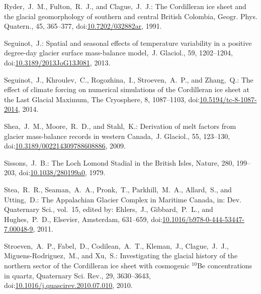 \documentclass[tc, manuscript]{copernicus}
\begin{document}
\begin{thebibliography}{114}
Ryder,~J.~M., Fulton,~R.~J., and Clague,~J.~J.: The Cordilleran ice sheet and the glacial geomorphology of southern and central British Colombia, G{e}ogr. Phys. Quatern., 45, 365--377,
doi:\href{http://dx.doi.org/10.7202/032882ar}{10.7202/032882ar}, 1991.


Seguinot,~J.: Spatial and seasonal effects of temperature variability in a positive degree-day glacier surface mass-balance model,~J. Glaciol., 59, 1202--1204,
doi:\href{http://dx.doi.org/10.3189/2013JoG13J081}{10.3189/2013JoG13J081}, 2013.


 Seguinot,~J., Khroulev,~C., Rogozhina,~I., Stroeven,~A.~P., and Zhang,~Q.: The effect of climate forcing on numerical simulations of the Cordilleran ice sheet at the Last Glacial Maximum, The Cryosphere, 8, 1087--1103,
doi:\href{http://dx.doi.org/10.5194/tc-8-1087-2014}{10.5194/tc-8-1087-2014}, 2014.



Shea,~J.~M., Moore,~R.~D., and Stahl,~K.: Derivation of melt factors from glacier mass-balance records in western Canada,~J. Glaciol., 55, 123--130,
doi:\href{http://dx.doi.org/10.3189/002214309788608886}{10.3189/002214309788608886}, 2009.


Sissons,~J.~B.: The Loch Lomond Stadial in the British Isles, Nature, 280, 199--203,
doi:\href{http://dx.doi.org/10.1038/280199a0}{10.1038/280199a0}, 1979.


Stea,~R.~R., Seaman,~A.~A., Pronk,~T., Parkhill,~M.~A., Allard,~S., and Utting,~D.: The Appalachian Glacier Complex in Maritime Canada, in:   Dev. Quaternary Sci., vol.~15, edited by: Ehlers,~J., Gibbard,~P.~L., and Hughes,~P.~D., Elsevier, Amsterdam, 631--659,
doi:\href{http://dx.doi.org/10.1016/b978-0-444-53447-7.00048-9}{10.1016/b978-0-444-53447-7.00048-9}, 2011.


Stroeven,~A.~P., Fabel,~D., Codilean,~A.~T., Kleman,~J., Clague,~J.~J., Miguens-Rodriguez,~M., and Xu,~S.: Investigating the glacial history of the northern sector of the Cordilleran ice sheet with cosmogenic $^{10}$Be concentrations in quartz, Quaternary Sci. Rev., 29, 3630--3643,
doi:\href{http://dx.doi.org/10.1016/j.quascirev.2010.07.010}{10.1016/j.quascirev.2010.07.010}, 2010.



\end{thebibliography}
\end{document}
